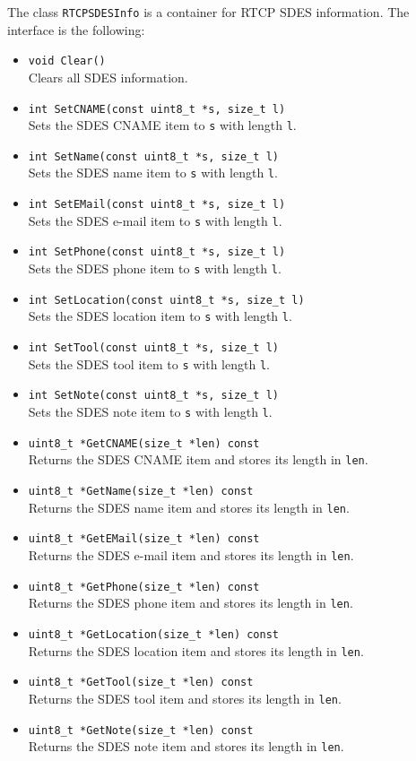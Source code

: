 \documentclass[12pt,a4paper]{article}
\begin{document}
				The class {\tt RTCPSDESInfo} is a container for RTCP SDES
				information. The interface is the following:
				\begin{itemize}
					\item {\tt void Clear()}\\
						Clears all SDES information.
					\item {\tt int SetCNAME(const uint8\_t *s, size\_t l)}\\
						Sets the SDES CNAME item to {\tt s} with length {\tt l}.
					\item {\tt int SetName(const uint8\_t *s, size\_t l)}\\
						Sets the SDES name item to {\tt s} with length {\tt l}.
					\item {\tt int SetEMail(const uint8\_t *s, size\_t l)}\\
						Sets the SDES e-mail item to {\tt s} with length {\tt l}.
					\item {\tt int SetPhone(const uint8\_t *s, size\_t l)}\\
						Sets the SDES phone item to {\tt s} with length {\tt l}.
					\item {\tt int SetLocation(const uint8\_t *s, size\_t l)}\\
						Sets the SDES location item to {\tt s} with length {\tt l}.
					\item {\tt int SetTool(const uint8\_t *s, size\_t l)}\\
						Sets the SDES tool item to {\tt s} with length {\tt l}.
					\item {\tt int SetNote(const uint8\_t *s, size\_t l)}\\
						Sets the SDES note item to {\tt s} with length {\tt l}.
					\item {\tt uint8\_t *GetCNAME(size\_t *len) const}\\
						Returns the SDES CNAME item and stores its length in {\tt len}.
					\item {\tt uint8\_t *GetName(size\_t *len) const}\\
						Returns the SDES name item and stores its length in {\tt len}.
					\item {\tt uint8\_t *GetEMail(size\_t *len) const}\\
						Returns the SDES e-mail item and stores its length in {\tt len}.
					\item {\tt uint8\_t *GetPhone(size\_t *len) const}\\
						Returns the SDES phone item and stores its length in {\tt len}.
					\item {\tt uint8\_t *GetLocation(size\_t *len) const}\\
						Returns the SDES location item and stores its length in {\tt len}.
					\item {\tt uint8\_t *GetTool(size\_t *len) const}\\
						Returns the SDES tool item and stores its length in {\tt len}.
					\item {\tt uint8\_t *GetNote(size\_t *len) const }\\
						Returns the SDES note item and stores its length in {\tt len}.
				\end{itemize}
\end{document}
